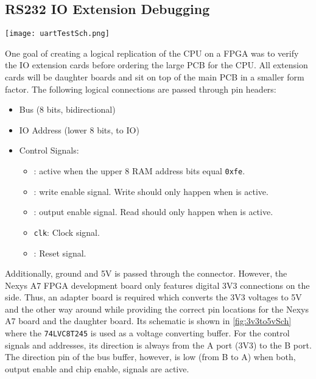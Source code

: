 \subsection{RS232 \gls{IO} Extension Debugging}
\begin{sidewaysfigure}[p]
  \centering
  \texttt{[image: uartTestSch.png]}
  \caption{The Schematic for the 3V3 to 5V conversion to use extension cards with the \gls{FPGA} development board.}
  \label{fig:3v3to5vSch}
\end{sidewaysfigure}
One goal of creating a logical replication of the \gls{CPU} on a \gls{FPGA} was to verify the \gls{IO} extension cards before ordering the large \gls{PCB} for the \gls{CPU}.
All extension cards will be daughter boards and sit on top of the main \gls{PCB} in a smaller form factor.
The following logical connections are passed through pin headers:
\begin{itemize}
  \item Bus (8 bits, bidirectional)
  \item \gls{IO} Address (lower 8 bits, to \gls{IO})
  \item Control Signals:
  \begin{itemize}
    \item \texttt{}: active when the upper 8 \gls{RAM} address bits equal \texttt{0xfe}.
    \item \texttt{}: write enable signal. Write should only happen when \texttt{} is active.
    \item \texttt{}: output enable signal. Read should only happen when \texttt{} is active.
    \item \texttt{clk}: Clock signal.
    \item \texttt{}: Reset signal.
  \end{itemize}
\end{itemize}
Additionally, ground and 5V is passed through the connector.
However, the Nexys A7 \gls{FPGA} development board only features digital 3V3 connections on the side.
Thus, an adapter board is required which converts the 3V3 voltages to 5V and the other way around while providing the correct pin locations for the Nexys A7 board and the daughter board.
Its schematic is shown in \cref{fig:3v3to5vSch} where the \texttt{74LVC8T245} is used as a voltage converting buffer.
For the control signals and addresses, its direction is always from the A port (3V3) to the B port.
The direction pin of the bus buffer, however, is low (from B to A) when both, output enable and chip enable, signals are active.